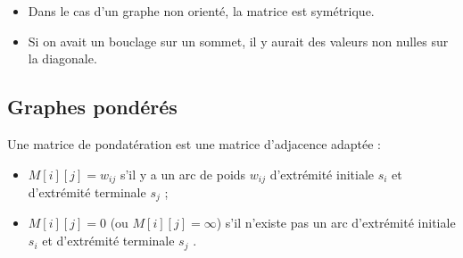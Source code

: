 \begin{rem}
\begin{itemize}
\item Dans le cas d'un graphe non orienté, la matrice est symétrique. 
\item Si on avait un bouclage sur un sommet, il y aurait des valeurs non nulles sur la diagonale. 
\end{itemize}
\end{rem}

\subsection{Graphes pondérés}
Une matrice de pondatération est une matrice d'adjacence adaptée : 
\begin{itemize}
\item $M[i][j] = w_{ij}$ s’il y a un arc de poids $w_{ij}$ d’extrémité initiale $s_i$ et d’extrémité terminale $s_j$ ;
\item $M[i][j] = 0$ (ou $M[i][j] = \infty$) s’il n’existe pas un arc d’extrémité initiale $s_i$ et d’extrémité
terminale $s_j$ .
\end{itemize}
%
%
%
%
%
